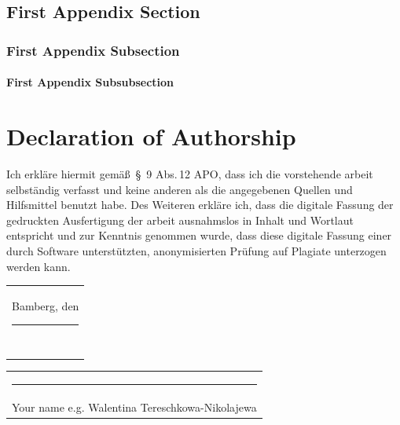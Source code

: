 \documentclass[
thesis%
]{csthes}
\begin{document}
\section{First Appendix Section}
\subsection{First Appendix Subsection}
\subsubsection{First Appendix Subsubsection}

\cleardoublepage



\chapter*{Declaration of Authorship}

Ich erkläre hiermit gemä\ss\ \S~9 Abs.\,12 APO, dass ich die vorstehende {\thesistype}arbeit 
selbständig verfasst und keine anderen als die angegebenen Quellen und Hilfsmittel benutzt habe. 
Des Weiteren erkläre ich, dass die digitale Fassung der gedruckten Ausfertigung 
der {\thesistype}arbeit ausnahmslos in Inhalt und Wortlaut entspricht und zur Kenntnis 
genommen wurde, dass diese digitale Fassung einer durch Software unterstützten, 
anonymisierten Prüfung auf Plagiate unterzogen werden kann. 

\bigskip
\bigskip

\begin{tabular}{@{}l@{}}
  Bamberg, den \rule[-0.8em]{7em}{0.5pt}\\[2ex]
  ~
\end{tabular}
\hspace{\fill}%
\begin{tabular}{@{}c@{}}
  \rule[-0.8em]{19em}{0.5pt}\\[2ex]
  {Your name e.g. Walentina Tereschkowa-Nikolajewa}
\end{tabular}\hspace{\fill}

\end{document}
